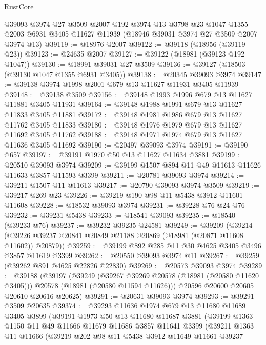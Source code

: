 \begin{lexlean}{RustCore}
\begin{coremodule}
    @39093
    @3974
    @27
    @3509
    @2007
    @192
    @3974
    @13
    @3798
    @23
    @1047
    @1355
    @2003
    @6931
    @3405
    @11627
    @11939
    (@18946 @39031 @3974 @27 @3509 @2007 @3974 @13)
@39119 := @18976 @2007
@39122 := @39118 (@18956 (@39119 @23))
@39123 := @24635 @2007
@39127 := @39122 (@18981 (@39123 @192 @1047))
@39130 := @18991 @39031 @27 @3509
@39136 := @39127 (@18503 (@39130 @1047 @1355 @6931 @3405))
@39138 := @20345 @39093 @3974
@39147 := @39138 @3974 @1998 @2001 @679 @13 @11627 @11931 @3405 @11939
@39148 := @39138 @3509
@39156 := @39148 @1993 @1996 @679 @13 @11627 @11881 @3405 @11931
@39164 := @39148 @1988 @1991 @679 @13 @11627 @11833 @3405 @11881
@39172 := @39148 @1981 @1986 @679 @13 @11627 @11762 @3405 @11833
@39180 := @39148 @1976 @1979 @679 @13 @11627 @11692 @3405 @11762
@39188 := @39148 @1971 @1974 @679 @13 @11627 @11636 @3405 @11692
@39190 := @20497 @39093 @3974
@39191 := @39190 @657
@39197 := @39191 @1970 @50 @13 @11627 @11634 @3881
@39199 := @20510 @39093 @3974
@39209 := @39199 @1507 @894 @11 @49 @11613 @11626 @11633 @3857 @11593 @3399
@39211 := @20781 @39093 @3974
@39214 := @39211 @1507 @11 @11613
@39217 := @20790 @39093 @3974 @3509
@39219 := @39217 @269 @23
@39226 := @39219 @190 @98 @11 @5438 @3912 @11601 @11608
@39228 := @18532 @39093 @3974
@39231 := @39228 @76 @24 @76
@39232 := @39231 @5438
@39233 := @18541 @39093
@39235 := @18540 (@39233 @76)
@39237 := @39232 @39235 @24581
@39249 := @39209
    (@39214 (@39226 @39237 @20841 @20849 @21188 @20869 (@18981 (@20871 @11608 @11602)) @20879))
@39259 := @39199 @892 @285 @11 @30 @4625 @3405 @3496 @3857 @11619 @3399
@39262 := @20550 @39093 @3974 @11
@39267 := @39259 (@39262 @891 @4625 @22826 @22830)
@39269 := @20573 @39093 @3974
@39289 := @39188
    (@39197
      (@39249
        (@39267 @39269 @20578 (@18981 (@20580 @11620 @3405)))
        @20578
        (@18981 (@20580 @11594 @11626)))
      @20596
      @20600
      @20605
      @20610
      @20616
      @20625)
@39291 := @20631 @39093 @3974
@39293 := @39291 @3509 @20635
@39374 := @39293
    @11636
    @1974
    @679
    @13
    @11680
    @11689
    @3405
    @3899
    (@39191
      @1973
      @50
      @13
      @11680
      @11687
      @3881
      (@39199
        @1363
        @1150
        @11
        @49
        @11666
        @11679
        @11686
        @3857
        @11641
        @3399
        (@39211
          @1363
          @11
          @11666
          (@39219
            @202
            @98
            @11
            @5438
            @3912
            @11649
            @11661
            @39237

\end{coremodule}
\end{lexlean}
